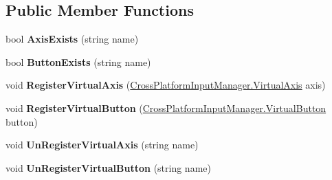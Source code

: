 \subsection*{Public Member Functions}
\begin{DoxyCompactItemize}
\item 
bool {\bfseries Axis\+Exists} (string name)\hypertarget{class_unity_standard_assets_1_1_cross_platform_input_1_1_virtual_input_ab5744afc94aa095e2f8149bc44920360}{}\label{class_unity_standard_assets_1_1_cross_platform_input_1_1_virtual_input_ab5744afc94aa095e2f8149bc44920360}

\item 
bool {\bfseries Button\+Exists} (string name)\hypertarget{class_unity_standard_assets_1_1_cross_platform_input_1_1_virtual_input_a5d70deed210f91fc144d9a62cab4c535}{}\label{class_unity_standard_assets_1_1_cross_platform_input_1_1_virtual_input_a5d70deed210f91fc144d9a62cab4c535}

\item 
void {\bfseries Register\+Virtual\+Axis} (\hyperlink{class_unity_standard_assets_1_1_cross_platform_input_1_1_cross_platform_input_manager_1_1_virtual_axis}{Cross\+Platform\+Input\+Manager.\+Virtual\+Axis} axis)\hypertarget{class_unity_standard_assets_1_1_cross_platform_input_1_1_virtual_input_aa530866e5a5597cee5f56a80b5074914}{}\label{class_unity_standard_assets_1_1_cross_platform_input_1_1_virtual_input_aa530866e5a5597cee5f56a80b5074914}

\item 
void {\bfseries Register\+Virtual\+Button} (\hyperlink{class_unity_standard_assets_1_1_cross_platform_input_1_1_cross_platform_input_manager_1_1_virtual_button}{Cross\+Platform\+Input\+Manager.\+Virtual\+Button} button)\hypertarget{class_unity_standard_assets_1_1_cross_platform_input_1_1_virtual_input_a6073a4d0dc59419c956d3454217f07c3}{}\label{class_unity_standard_assets_1_1_cross_platform_input_1_1_virtual_input_a6073a4d0dc59419c956d3454217f07c3}

\item 
void {\bfseries Un\+Register\+Virtual\+Axis} (string name)\hypertarget{class_unity_standard_assets_1_1_cross_platform_input_1_1_virtual_input_a97ed9f03493198eab55eb47e9fa77801}{}\label{class_unity_standard_assets_1_1_cross_platform_input_1_1_virtual_input_a97ed9f03493198eab55eb47e9fa77801}

\item 
void {\bfseries Un\+Register\+Virtual\+Button} (string name)\hypertarget{class_unity_standard_assets_1_1_cross_platform_input_1_1_virtual_input_aff127b39add01c4d34a6b5a396d42ea1}{}\label{class_unity_standard_assets_1_1_cross_platform_input_1_1_virtual_input_aff127b39add01c4d34a6b5a396d42ea1}


\end{DoxyCompactItemize}
